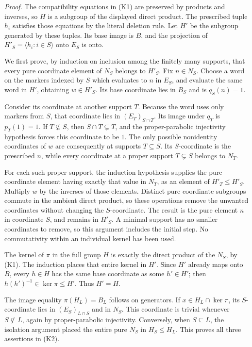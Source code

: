 \emph{Proof.} The compatibility equations in (K1) are preserved by products and inverses, so \(H\) is a subgroup of the displayed direct product. The prescribed tuple \(h_i\) satisfies those equations by the literal deletion rule. Let \(H'\) be the subgroup generated by these tuples. Its base image is \(B\), and the projection of \(H'_S=\langle h_i:i\in S\rangle\) onto \(E_S\) is onto.

We first prove, by induction on inclusion among the finitely many supports, that every pure coordinate element of \(N_S\) belongs to \(H'_S\). Fix \(n\in N_S\). Choose a word on the markers indexed by \(S\) which evaluates to \(n\) in \(E_S\), and evaluate the same word in \(H'\), obtaining \(w\in H'_S\). Its base coordinate lies in \(B_S\) and is \(q_S(n)=1\).

Consider its coordinate at another support \(T\). Because the word uses only markers from \(S\), that coordinate lies in \((E_T)_{S\cap T}\). Its image under \(q_T\) is \(p_T(1)=1\). If \(T\not\subseteq S\), then \(S\cap T\subsetneq T\), and the proper-parabolic injectivity hypothesis forces this coordinate to be \(1\). The only possible nonidentity coordinates of \(w\) are consequently at supports \(T\subseteq S\). Its \(S\)-coordinate is the prescribed \(n\), while every coordinate at a proper support \(T\subsetneq S\) belongs to \(N_T\).

For each such proper support, the induction hypothesis supplies the pure coordinate element having exactly that value in \(N_T\), as an element of \(H'_T\leq H'_S\). Multiply \(w\) by the inverses of those elements. Distinct pure coordinate subgroups commute in the ambient direct product, so these operations remove the unwanted coordinates without changing the \(S\)-coordinate. The result is the pure element \(n\) in coordinate \(S\), and remains in \(H'_S\). A minimal support has no smaller coordinates to remove, so this argument includes the initial step. No commutativity within an individual kernel has been used.

The kernel of \(\pi\) in the full group \(H\) is exactly the direct product of the \(N_S\), by (K1). The induction places that entire kernel in \(H'\). Since \(H'\) already maps onto \(B\), every \(h\in H\) has the same base coordinate as some \(h'\in H'\); then \(h(h')^{-1}\in\ker\pi\leq H'\). Thus \(H'=H\).

The image equality \(\pi(H_L)=B_L\) follows on generators. If \(x\in H_L\cap\ker\pi\), its \(S\)-coordinate lies in \((E_S)_{L\cap S}\) and in \(N_S\). This coordinate is trivial whenever \(S\not\subseteq L\), again by proper-parabolic injectivity. Conversely, when \(S\subseteq L\), the isolation argument placed the entire pure \(N_S\) in \(H_S\leq H_L\). This proves all three assertions in (K2).

